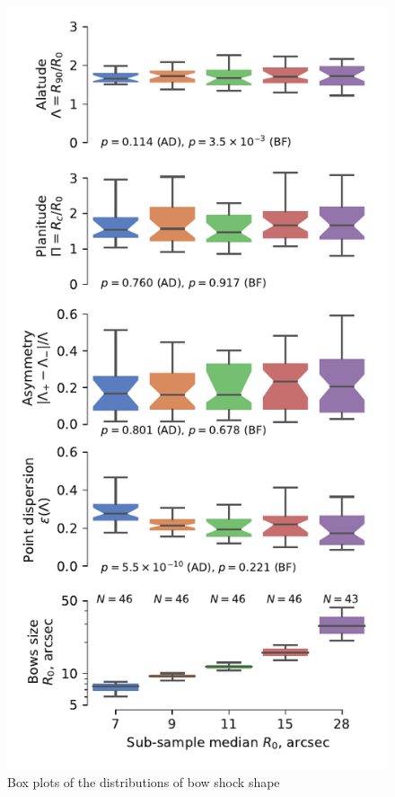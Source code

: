 \documentclass[useAMS, usenatbib, a4paper]{mnras}
\begin{document}
\begin{figure}
  \centering
  \includegraphics[width=\linewidth]
  {figs/mipsgal-boxplot-Rc-R90-versus-R0}
  \vspace*{-\baselineskip}
  \caption{Box plots of the distributions of bow shock shape
}
\end{figure}
\end{document}
